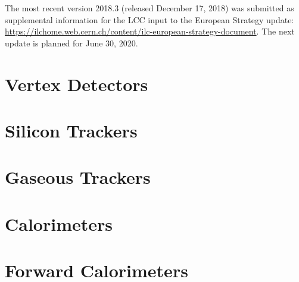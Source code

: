 \documentclass[10pt,final]{report}
\begin{document}
The most recent version 2018.3 (released December 17, 2018) was submitted as supplemental information for the LCC input to the European Strategy update: \url{https://ilchome.web.cern.ch/content/ilc-european-strategy-document}. The next update is planned for June 30, 2020.


\chapter{Vertex Detectors}








\newpage

% 
\newpage
\chapter{Silicon Trackers}





\chapter{Gaseous Trackers}



\chapter{Calorimeters}













\chapter{Forward Calorimeters}



\end{document}
